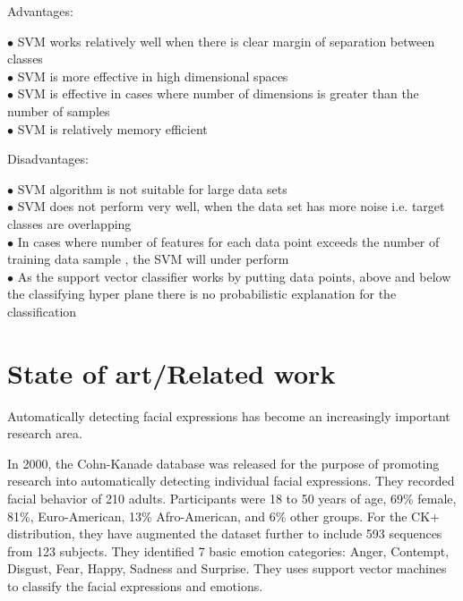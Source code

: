 \documentclass[runningheads,a4paper,11pt]{report}
\begin{document}
Advantages:
\begin{itemize}
	 {\color{blue}$\bullet$} SVM works relatively well when there is clear margin of separation between classes\\
	{\color{blue}$\bullet$} SVM is more effective in high dimensional spaces\\
	{\color{blue}$\bullet$} SVM is effective in cases where number of dimensions is greater than the number of samples\\
	 {\color{blue}$\bullet$} SVM is relatively memory efficient\\
\end{itemize}
Disadvantages:
\begin{itemize}
 {\color{red}$\bullet$} SVM algorithm is not suitable for large data sets \\
 {\color{red}$\bullet$} SVM does not perform very well, when the data set has more noise i.e. target classes are overlapping \\
 {\color{red}$\bullet$} In cases where number of features for each data point exceeds the number of training data sample , the SVM will under perform \\
 {\color{red}$\bullet$} As the support vector classifier works by putting data points, above and below the classifying hyper plane there is no probabilistic explanation for the classification \\
\end{itemize}



\chapter{State of art/Related work}
\label{chapter:stateOfArt}

Automatically detecting facial expressions has become an increasingly important research area.

In 2000, the Cohn-Kanade database was released for the purpose of promoting research into automatically detecting individual facial expressions. \cite{Lucey10}
They recorded facial behavior of 210 adults. Participants were 18 to 50 years of age, 69\% female, 81\%, Euro-American, 13\% Afro-American, and 6\% other groups. For the CK+ distribution, they have augmented the dataset further to include 593 sequences from 123 subjects.
They identified 7 basic emotion categories: Anger, Contempt, Disgust, Fear, Happy, Sadness and Surprise.
They uses support vector machines to classify the facial expressions and emotions.
\end{document}
